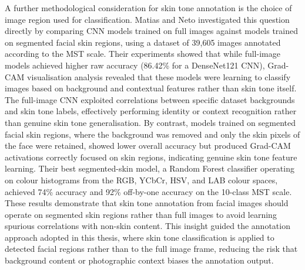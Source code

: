 A further methodological consideration for skin tone annotation is the choice of image region used for classification. Matias and Neto \cite{Matias_2024_EnhancingFairnessMST} investigated this question directly by comparing CNN models trained on full images against models trained on segmented facial skin regions, using a dataset of 39,605 images annotated according to the MST scale. Their experiments showed that while full-image models achieved higher raw accuracy (86.42\% for a DenseNet121 CNN), Grad-CAM visualisation analysis revealed that these models were learning to classify images based on background and contextual features rather than skin tone itself. The full-image CNN exploited correlations between specific dataset backgrounds and skin tone labels, effectively performing identity or context recognition rather than genuine skin tone generalisation. By contrast, models trained on segmented facial skin regions, where the background was removed and only the skin pixels of the face were retained, showed lower overall accuracy but produced Grad-CAM activations correctly focused on skin regions, indicating genuine skin tone feature learning. Their best segmented-skin model, a Random Forest classifier operating on colour histograms from the RGB, YCbCr, HSV, and LAB colour spaces, achieved 74\% accuracy and 92\% off-by-one accuracy on the 10-class MST scale. These results demonstrate that skin tone annotation from facial images should operate on segmented skin regions rather than full images to avoid learning spurious correlations with non-skin content. This insight guided the annotation approach adopted in this thesis, where skin tone classification is applied to detected facial regions rather than to the full image frame, reducing the risk that background content or photographic context biases the annotation output.


